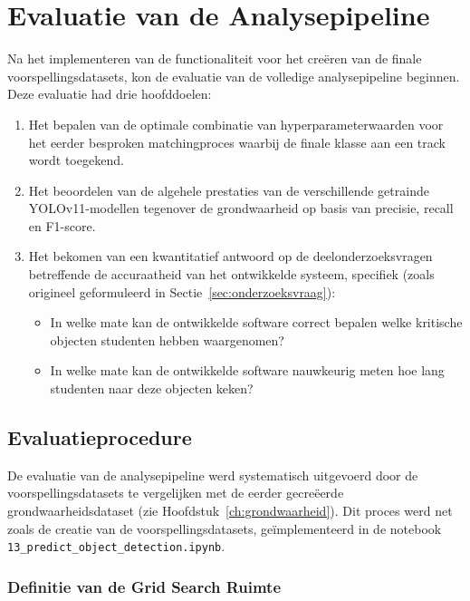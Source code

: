 \section{Evaluatie van de Analysepipeline}

Na het implementeren van de functionaliteit voor het creëren van de finale voorspellingsdatasets, 
kon de evaluatie van de volledige analysepipeline beginnen. Deze evaluatie had drie hoofddoelen:
\begin{enumerate}
    \item Het bepalen van de optimale combinatie van hyperparameterwaarden voor het eerder besproken matchingproces waarbij de finale klasse aan een track wordt toegekend.
    \item Het beoordelen van de algehele prestaties van de verschillende getrainde YOLOv11-modellen tegenover de grondwaarheid op basis van precisie, recall en F1-score.
    \item Het bekomen van een kwantitatief antwoord op de deelonderzoeksvragen betreffende de accuraatheid van het 
    ontwikkelde systeem, specifiek (zoals origineel geformuleerd in Sectie~\ref{sec:onderzoeksvraag}):
        \begin{itemize}
            \item In welke mate kan de ontwikkelde software correct bepalen welke kritische objecten studenten hebben waargenomen?
            \item In welke mate kan de ontwikkelde software nauwkeurig meten hoe lang studenten naar deze objecten keken?
        \end{itemize}
\end{enumerate}

\subsection{Evaluatieprocedure}

De evaluatie van de analysepipeline werd systematisch uitgevoerd door de voorspellingsdatasets 
te vergelijken met de eerder gecreëerde grondwaarheidsdataset (zie Hoofdstuk~\ref{ch:grondwaarheid}). 
Dit proces werd net zoals de creatie van de voorspellingsdatasets,
geïmplementeerd in de notebook \texttt{13\_predict\_object\_detection.ipynb}.

\subsubsection{Definitie van de Grid Search Ruimte}

